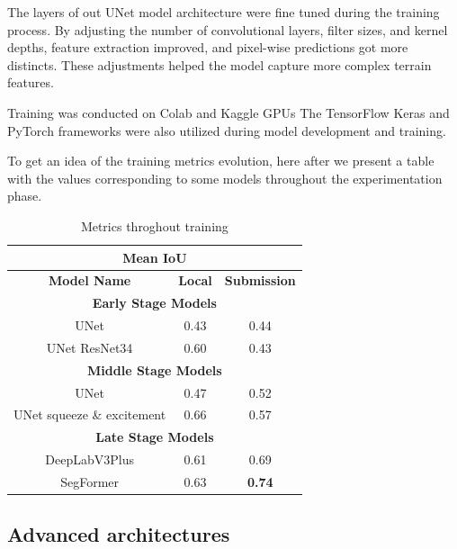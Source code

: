 \documentclass[11pt]{article}
\begin{document}
\begin{multicols}{2}
        The layers of out UNet model architecture were fine tuned during the training process.
        By adjusting the number of convolutional layers, filter sizes, and kernel depths, feature extraction improved, and pixel-wise predictions got more distincts.
        These adjustments helped the model capture more complex terrain features.

        Training was conducted on Colab\cite{colab2024} and Kaggle\cite{kaggle2024} GPUs
        The TensorFlow\cite{tensorflow2015} Keras\cite{keras2015} and PyTorch\cite{pytorch2019} frameworks were also utilized during model development and training.

        To get an idea of the training metrics evolution, here after we present a table with the values corresponding to some models throughout the experimentation phase.

        \begin{table}[H]
            \centering
            \small
            \begin{tabular}{|c|c|c|}
                \hline
                \multicolumn{3}{|c|}{\textbf{Mean IoU}} \\ \hline
                \textbf{Model Name} & \textbf{Local} & \textbf{Submission} \\ \hline
                \multicolumn{3}{|c|}{\textbf{Early Stage Models}} \\ \hline
                UNet & 0.43 & 0.44  \\ \hline
                UNet ResNet34 & 0.60 & 0.43 \\ \hline
                \multicolumn{3}{|c|}{\textbf{Middle Stage Models}} \\ \hline
                UNet & 0.47 & 0.52 \\ \hline
                UNet squeeze \& excitement & 0.66 & 0.57 \\ \hline
                \multicolumn{3}{|c|}{\textbf{Late Stage Models}} \\ \hline
                DeepLabV3Plus & 0.61 & 0.69 \\ \hline
                SegFormer & 0.63 & \textbf{0.74} \\ \hline
            \end{tabular}
            \caption{Metrics throghout training}
        \end{table}
        
        \subsection{Advanced architectures}
        

\end{multicols}
\end{document}
